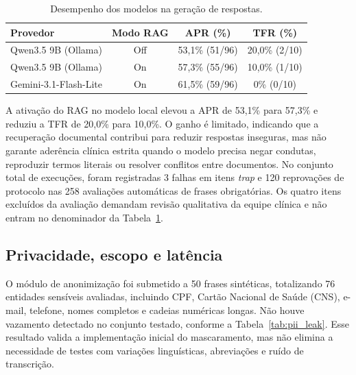 \documentclass[12pt]{article}
\begin{document}
\begin{table}[H]
  \centering
  \caption{Desempenho dos modelos na geração de respostas.}
  \label{tab:apr_tfr_providers}
  \small
  \begin{tabular}{lccc}
  	\toprule
  	\textbf{Provedor}           & \textbf{Modo RAG} & \textbf{APR (\%)} & \textbf{TFR (\%)} \\
  	\midrule
  	Qwen3.5 9B (Ollama)         & Off               & 53,1\% (51/96)    & 20,0\% (2/10)     \\
	  Qwen3.5 9B (Ollama)         & On                & 57,3\% (55/96)    & 10,0\% (1/10)     \\
  	Gemini-3.1-Flash-Lite       & On                & 61,5\% (59/96)    & 0\% (0/10)      \\
  	\bottomrule
  \end{tabular}
  \end{table}

A ativação do RAG no modelo local elevou a APR de 53,1\% para 57,3\% e reduziu a TFR de 20,0\% para 10,0\%.
O ganho é limitado, indicando que a recuperação documental contribui para reduzir respostas inseguras, mas não garante aderência clínica estrita quando o modelo precisa negar condutas, reproduzir termos literais ou resolver conflitos entre documentos.
No conjunto total de execuções, foram registradas 3 falhas em itens \textit{trap} e 120 reprovações de protocolo nas 258 avaliações automáticas de frases obrigatórias.
Os quatro itens excluídos da avaliação demandam revisão qualitativa da equipe clínica e não entram no denominador da Tabela~\ref{tab:apr_tfr_providers}.


\subsection{Privacidade, escopo e latência}

O módulo de anonimização foi submetido a 50 frases sintéticas, totalizando 76 entidades sensíveis avaliadas, incluindo CPF, Cartão Nacional de Saúde (CNS), e-mail, telefone, nomes completos e cadeias numéricas longas.
Não houve vazamento detectado no conjunto testado, conforme a Tabela~\ref{tab:pii_leak}. Esse resultado valida a implementação inicial do mascaramento, mas não elimina a necessidade de testes com variações linguísticas, abreviações e ruído de transcrição.
\end{document}
